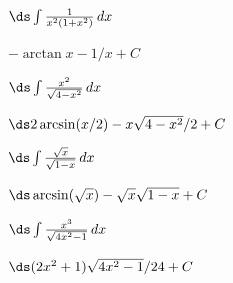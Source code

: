 \begin{enumialphparenastyle}
\begin{ex}
 $\ds\int{1\over x^2(1+x^2)}\,dx$
\begin{sol}
 $-\arctan x - 1/x+C$
\end{sol}
\end{ex}

\begin{ex}
 $\ds\int{x^2\over\sqrt{4-x^2}}\,dx$
\begin{sol}
 $\ds 2\arcsin(x/2)-x\sqrt{4-x^2}/2+C$
\end{sol}
\end{ex}

\begin{ex}
 $\ds\int{\sqrt{x}\over\sqrt{1-x}}\,dx$
\begin{sol}
 $\ds \arcsin(\sqrt{x})-\sqrt{x}\sqrt{1-x}+C$
\end{sol}
\end{ex}

\begin{ex}
 $\ds\int{x^3\over\sqrt{4x^2-1}}\,dx$
\begin{sol}
 $\ds (2x^2+1)\sqrt{4x^2-1}/24+C$
\end{sol}
\end{ex}

\end{enumialphparenastyle}